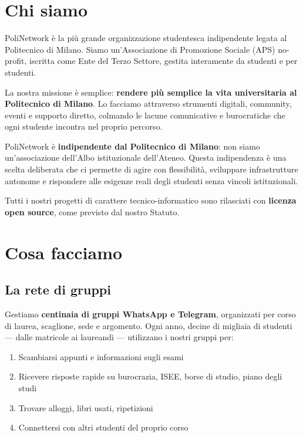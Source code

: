 \documentclass[letter]{polinetwork}
\begin{document}
\pnMakeHeader

\section{Chi siamo}

PoliNetwork è la più grande organizzazione studentesca indipendente
legata al Politecnico di Milano. Siamo un'Associazione di Promozione
Sociale (APS) no-profit, iscritta come Ente del Terzo Settore,
gestita interamente da studenti e per studenti.

La nostra missione è semplice: \textbf{rendere più semplice la vita
	universitaria al Politecnico di Milano}. Lo facciamo attraverso
strumenti digitali, community, eventi e supporto diretto, colmando
le lacune comunicative e burocratiche che ogni studente incontra nel
proprio percorso.

PoliNetwork è \textbf{indipendente dal Politecnico di Milano}: non
siamo un'associazione dell'Albo istituzionale dell'Ateneo.
Questa indipendenza è una scelta deliberata che ci permette di agire
con flessibilità, sviluppare infrastrutture autonome e rispondere
alle esigenze reali degli studenti senza vincoli istituzionali.

Tutti i nostri progetti di carattere tecnico-informatico sono
rilasciati con \textbf{licenza open source}, come previsto dal
nostro Statuto.

\section{Cosa facciamo}

\subsection{La rete di gruppi}

Gestiamo \textbf{centinaia di gruppi WhatsApp e Telegram}, organizzati
per corso di laurea, scaglione, sede e argomento. Ogni anno, decine di
migliaia di studenti — dalle matricole ai laureandi — utilizzano i
nostri gruppi per:

\begin{enumerate}[leftmargin=2em]
	\item Scambiarsi appunti e informazioni sugli esami
	\item Ricevere risposte rapide su burocrazia, ISEE, borse di studio, piano degli studi
	\item Trovare alloggi, libri usati, ripetizioni
	\item Connettersi con altri studenti del proprio corso
\end{enumerate}
\end{document}
